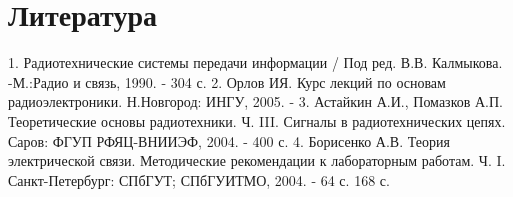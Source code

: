 ﻿\documentclass[a4paper,12pt]{article}
\begin{document}
\section{Литература}
1.	Радиотехнические системы передачи информации / Под ред. В.В. Калмыкова. -М.:Радио и связь, 1990. - 304 с.
2.	Орлов ИЯ. Курс лекций по основам радиоэлектроники. Н.Новгород: ИНГУ, 2005. -
3.	Астайкин А.И., Помазков А.П. Теоретические основы радиотехники. Ч. III. Сигналы в радиотехнических цепях. Саров: ФГУП РФЯЦ-ВНИИЭФ, 2004. - 400 с.
4.	Борисенко А.В. Теория электрической связи. Методические рекомендации к лабораторным работам. Ч. I. Санкт-Петербург: СПбГУТ; СПбГУИТМО, 2004. - 64 с.
168 с.
\end{document}
